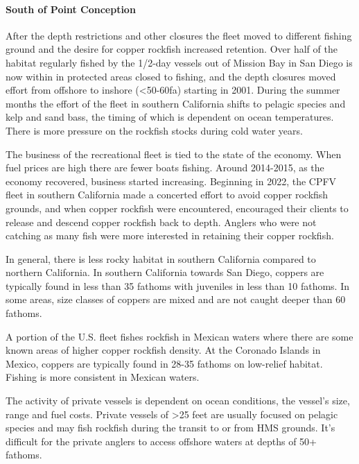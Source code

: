 \documentclass[11pt,
  english,
  letterpaper,
]{article}
\begin{document}
\hypertarget{south-of-point-conception}{%
\paragraph{South of Point Conception}\label{south-of-point-conception}}

After the depth restrictions and other closures the fleet moved to different fishing ground and the desire for copper rockfish increased retention. Over half of the habitat regularly fished by the 1/2-day vessels out of Mission Bay in San Diego is now within in protected areas closed to fishing, and the depth closures moved effort from offshore to inshore (\textless50-60fa) starting in 2001. During the summer months the effort of the fleet in southern California shifts to pelagic species and kelp and sand bass, the timing of which is dependent on ocean temperatures. There is more pressure on the rockfish stocks during cold water years.

The business of the recreational fleet is tied to the state of the economy. When fuel prices are high there are fewer boats fishing. Around 2014-2015, as the economy recovered, business started increasing. Beginning in 2022, the CPFV fleet in southern California made a concerted effort to avoid copper rockfish grounds, and when copper rockfish were encountered, encouraged their clients to release and descend copper rockfish back to depth. Anglers who were not catching as many fish were more interested in retaining their copper rockfish.

In general, there is less rocky habitat in southern California compared to northern California. In southern California towards San Diego, coppers are typically found in less than 35 fathoms with juveniles in less than 10 fathoms. In some areas, size classes of coppers are mixed and are not caught deeper than 60 fathoms.

A portion of the U.S. fleet fishes rockfish in Mexican waters where there are some known areas of higher copper rockfish density. At the Coronado Islands in Mexico, coppers are typically found in 28-35 fathoms on low-relief habitat. Fishing is more consistent in Mexican waters.

The activity of private vessels is dependent on ocean conditions, the vessel's size, range and fuel costs. Private vessels of \textgreater25 feet are usually focused on pelagic species and may fish rockfish during the transit to or from HMS grounds. It's difficult for the private anglers to access offshore waters at depths of 50+ fathoms.
\end{document}
